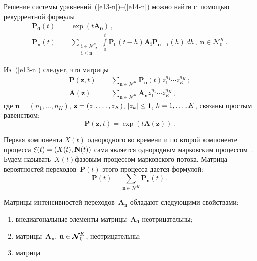 {\begin{multicols}{2}
  Решение системы уравнений~(\ref{e13-n})--(\ref{e14-n}) можно найти 
с~помощью рекуррентной формулы 
  \begin{align*}
  \mathbf{P}_{\mathbf{0}}(t)&=\exp (t\mathbf{A}_{\mathbf{0}})\,,\\
  \mathbf{P}_{\mathbf{n}}(t)&=\sum\limits_{\substack{{\mathbf{i}\in 
\boldsymbol{\mathcal{N}}_0^k,}\\
{\mathbf{i}\leq \mathbf{n}}}} \displaystyle
  \int\limits_0^t \mathbf{P}_0(t-h) 
\mathbf{A}_{\mathbf{i}} \mathbf{P}_{\mathbf{n}-\mathbf{i}}(h)\,dh\,,\
\mathbf{n}\in \boldsymbol{\mathcal{N}}_0^K\,.
  \end{align*}
                    
  
  Из~(\ref{e13-n}) следует, что матрицы 
 \begin{align*}
  \mathbf{P}(\mathbf{z},t) &=\sum\limits_{\mathbf{n}\in 
\boldsymbol{\mathcal{N}}^K} \mathbf{P}_{\mathbf{n}}(t) z_1^{n_1}\cdots 
z_K^{n_K}\,;\\
  \mathbf{A}(\mathbf{z})&=\sum\limits_{\mathbf{n}\in 
\boldsymbol{\mathcal{N}}^K}  \mathbf{A}_\mathbf{n} z_1^{n_1}\cdots 
z_K^{n_K}\,,
 \end{align*}
где $\mathbf{n}=(n_1, \ldots , n_K)$, $\mathbf{z}\hm= (z_1, \ldots , z_K)$, $\vert 
z_k\vert \hm\leq 1$, $k\hm=1,\ldots , K$, связаны простым равенством: 
\begin{equation*}
\mathbf{P}(\mathbf{z},t) =\exp (t\mathbf{A}(\mathbf{z}))\,.
\end{equation*}
  
  Первая компонента $X(t)$ однородного во времени и по второй компоненте 
процесса $\xi(t)\hm= (X(t), \mathbf{N}(t))$ сама является однородным 
мар\-ковским процессом~\cite{24-n}. Будем называть~$X(t)$\linebreak фазовым процессом 
марковского потока. Матрица вероятностей переходов~$\mathbf{P}(t)$ этого 
процесса дается формулой:
  \begin{equation*}
  \mathbf{P}(t)=\sum\limits_{\mathbf{n}\in \boldsymbol{\mathcal{N}}^K} 
\mathbf{P}_{\mathbf{n}} (t)\,.
  \end{equation*}
  
  Матрицы интенсивностей переходов~$\mathbf{A}_{\mathbf{n}}$ обладают 
следующими свойствами:
  \begin{enumerate}[(1)]
\item внедиагональные элементы матрицы~$\mathbf{A}_{\mathbf{0}}$ 
не\-от\-ри\-ца\-тельны;
\item матрицы~$\mathbf{A}_{\mathbf{n}}$, $\mathbf{n}\hm\in 
\boldsymbol{\mathcal{N}}_0^K$, не\-от\-ри\-ца\-тельны;
\item матрица 


\end{enumerate}
\end{multicols}}
